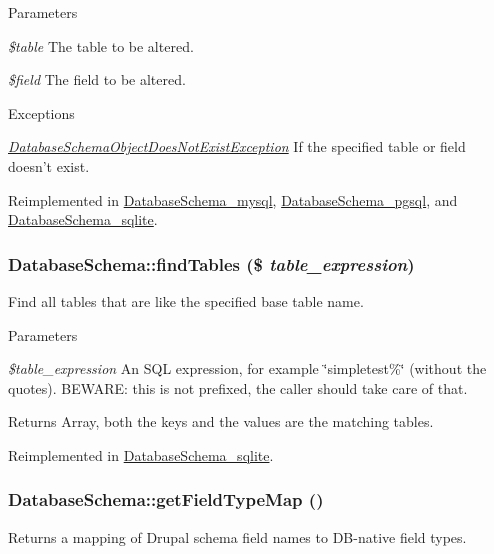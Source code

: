 \begin{DoxyParams}{Parameters}
\item[{\em \$table}]The table to be altered. \item[{\em \$field}]The field to be altered.\end{DoxyParams}

\begin{DoxyExceptions}{Exceptions}
\item[{\em \hyperlink{classDatabaseSchemaObjectDoesNotExistException}{DatabaseSchemaObjectDoesNotExistException}}]If the specified table or field doesn't exist. \end{DoxyExceptions}


Reimplemented in \hyperlink{classDatabaseSchema__mysql_abf4208a396175d211decc395ea6cc63f}{DatabaseSchema\_\-mysql}, \hyperlink{classDatabaseSchema__pgsql_ab2d9f824a7b01c5b6ed218cd6beae1cb}{DatabaseSchema\_\-pgsql}, and \hyperlink{classDatabaseSchema__sqlite_a607aa7b0fef26ab3dfd08d46103ad4ce}{DatabaseSchema\_\-sqlite}.\hypertarget{classDatabaseSchema_aecbf376fb9d85811278ee6448e99feca}{
\subsubsection[{findTables}]{\setlength{\rightskip}{0pt plus 5cm}DatabaseSchema::findTables (\$ {\em table\_\-expression})}}
\label{classDatabaseSchema_aecbf376fb9d85811278ee6448e99feca}
Find all tables that are like the specified base table name.


\begin{DoxyParams}{Parameters}
\item[{\em \$table\_\-expression}]An SQL expression, for example \char`\"{}simpletest\%\char`\"{} (without the quotes). BEWARE: this is not prefixed, the caller should take care of that.\end{DoxyParams}
\begin{DoxyReturn}{Returns}
Array, both the keys and the values are the matching tables. 
\end{DoxyReturn}


Reimplemented in \hyperlink{classDatabaseSchema__sqlite_a7cfb91db091c6f998be9d660ea5c63ae}{DatabaseSchema\_\-sqlite}.\hypertarget{classDatabaseSchema_a82022c76c3131c4d745736d08321b788}{
\subsubsection[{getFieldTypeMap}]{\setlength{\rightskip}{0pt plus 5cm}DatabaseSchema::getFieldTypeMap ()}}
\label{classDatabaseSchema_a82022c76c3131c4d745736d08321b788}
Returns a mapping of Drupal schema field names to DB-\/native field types.

